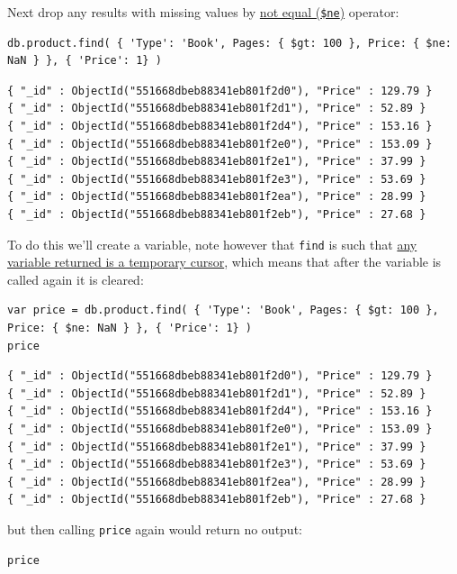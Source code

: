 \documentclass[11pt]{article}
\begin{document}
Next drop any results with missing values by \href{https://docs.mongodb.com/manual/reference/operator/query/}{not equal (\texttt{\$ne})} operator:

\begin{verbatim}
db.product.find( { 'Type': 'Book', Pages: { $gt: 100 }, Price: { $ne: NaN } }, { 'Price': 1} )
\end{verbatim}

\begin{verbatim}
{ "_id" : ObjectId("551668dbeb88341eb801f2d0"), "Price" : 129.79 }
{ "_id" : ObjectId("551668dbeb88341eb801f2d1"), "Price" : 52.89 }
{ "_id" : ObjectId("551668dbeb88341eb801f2d4"), "Price" : 153.16 }
{ "_id" : ObjectId("551668dbeb88341eb801f2e0"), "Price" : 153.09 }
{ "_id" : ObjectId("551668dbeb88341eb801f2e1"), "Price" : 37.99 }
{ "_id" : ObjectId("551668dbeb88341eb801f2e3"), "Price" : 53.69 }
{ "_id" : ObjectId("551668dbeb88341eb801f2ea"), "Price" : 28.99 }
{ "_id" : ObjectId("551668dbeb88341eb801f2eb"), "Price" : 27.68 }
\end{verbatim}

To do this we'll create a variable, note however that \texttt{find} is such that \href{https://stackoverflow.com/a/21285674/12843551}{any variable returned is a temporary cursor}, which means that after the variable is called again it is cleared:

\begin{verbatim}
var price = db.product.find( { 'Type': 'Book', Pages: { $gt: 100 }, Price: { $ne: NaN } }, { 'Price': 1} )
price
\end{verbatim}

\begin{verbatim}
{ "_id" : ObjectId("551668dbeb88341eb801f2d0"), "Price" : 129.79 }
{ "_id" : ObjectId("551668dbeb88341eb801f2d1"), "Price" : 52.89 }
{ "_id" : ObjectId("551668dbeb88341eb801f2d4"), "Price" : 153.16 }
{ "_id" : ObjectId("551668dbeb88341eb801f2e0"), "Price" : 153.09 }
{ "_id" : ObjectId("551668dbeb88341eb801f2e1"), "Price" : 37.99 }
{ "_id" : ObjectId("551668dbeb88341eb801f2e3"), "Price" : 53.69 }
{ "_id" : ObjectId("551668dbeb88341eb801f2ea"), "Price" : 28.99 }
{ "_id" : ObjectId("551668dbeb88341eb801f2eb"), "Price" : 27.68 }
\end{verbatim}


but then calling \texttt{price} again would return no output:

\begin{verbatim}
price
\end{verbatim}
\end{document}
